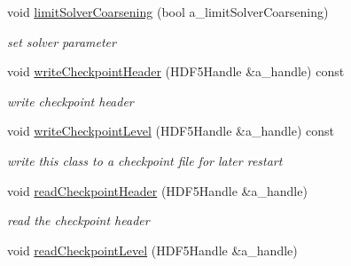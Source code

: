 \begin{DoxyCompactItemize}
\item 
\hypertarget{class_c_c_projector_comp_a0c2d3335a7387de39fddee130f679ddc}{void \hyperlink{class_c_c_projector_comp_a0c2d3335a7387de39fddee130f679ddc}{limit\-Solver\-Coarsening} (bool a\-\_\-limit\-Solver\-Coarsening)}\label{class_c_c_projector_comp_a0c2d3335a7387de39fddee130f679ddc}

\begin{DoxyCompactList}\small\item\em set solver parameter \end{DoxyCompactList}\item 
\hypertarget{class_c_c_projector_comp_a081ce49115560e36acea05baff07a409}{void \hyperlink{class_c_c_projector_comp_a081ce49115560e36acea05baff07a409}{write\-Checkpoint\-Header} (H\-D\-F5\-Handle \&a\-\_\-handle) const }\label{class_c_c_projector_comp_a081ce49115560e36acea05baff07a409}

\begin{DoxyCompactList}\small\item\em write checkpoint header \end{DoxyCompactList}\item 
\hypertarget{class_c_c_projector_comp_ae2e318dba78777a59baf4dd5f1ddf859}{void \hyperlink{class_c_c_projector_comp_ae2e318dba78777a59baf4dd5f1ddf859}{write\-Checkpoint\-Level} (H\-D\-F5\-Handle \&a\-\_\-handle) const }\label{class_c_c_projector_comp_ae2e318dba78777a59baf4dd5f1ddf859}

\begin{DoxyCompactList}\small\item\em write this class to a checkpoint file for later restart \end{DoxyCompactList}\item 
\hypertarget{class_c_c_projector_comp_a1033fe7ef0e004d9c18ff1216da491dc}{void \hyperlink{class_c_c_projector_comp_a1033fe7ef0e004d9c18ff1216da491dc}{read\-Checkpoint\-Header} (H\-D\-F5\-Handle \&a\-\_\-handle)}\label{class_c_c_projector_comp_a1033fe7ef0e004d9c18ff1216da491dc}

\begin{DoxyCompactList}\small\item\em read the checkpoint header \end{DoxyCompactList}\item 
\hypertarget{class_c_c_projector_comp_ab27369efcde40be42bee263d1667d345}{void \hyperlink{class_c_c_projector_comp_ab27369efcde40be42bee263d1667d345}{read\-Checkpoint\-Level} (H\-D\-F5\-Handle \&a\-\_\-handle)}\label{class_c_c_projector_comp_ab27369efcde40be42bee263d1667d345}


\end{DoxyCompactItemize}

